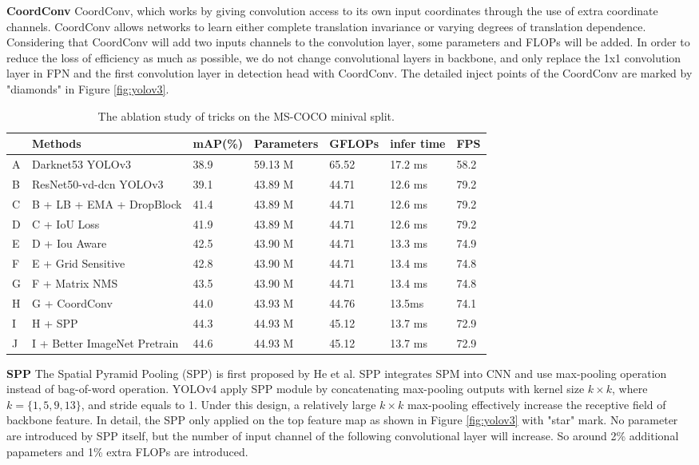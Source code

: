 \documentclass[10pt,twocolumn,letterpaper]{article}
\newcommand{\pheadB}[1] {\vspace{1mm}\noindent\textbf{#1}}
\begin{document}
	\pheadB{CoordConv} \cite{coordconv}
	CoordConv, which works by giving convolution access to its own input coordinates through the use of extra coordinate channels.  CoordConv allows networks to learn either complete translation invariance or varying degrees of translation dependence. Considering that CoordConv will add two inputs channels to the convolution layer, some parameters and FLOPs will be added. In order to reduce the loss of efficiency as much as possible, we do not change convolutional layers in backbone, and only replace the 1x1 convolution layer in FPN and the first convolution layer in detection head with CoordConv.
	The detailed inject points of the CoordConv are marked by "diamonds" in Figure \ref{fig:yolov3}.
	
	\begin{table*}[t!]
		\centering
\begin{tabular}{l|l|l|l|l|l|l}
			\hline
			& \textbf{Methods} & \textbf{mAP(\%)} & \textbf{Parameters} & \textbf{GFLOPs} & 
			\textbf{infer time} & \textbf{FPS} \\ 
			\hline
			\hline
			A & Darknet53 YOLOv3 & 38.9 &59.13 M & 65.52 & 17.2 ms & 58.2  \\ 
			\hline
			\hline
			B & ResNet50-vd-dcn YOLOv3 & 39.1 &43.89 M & 44.71 & 12.6 ms& 79.2 \\ 
			C & B + LB + EMA + DropBlock & 41.4 &43.89 M  & 44.71& 12.6 ms& 79.2\\ 
			D & C +  IoU Loss & 41.9 &43.89 M & 44.71 & 12.6 ms& 79.2 \\ 
			E & D + Iou Aware & 42.5 &43.90 M & 44.71 & 13.3 ms& 74.9\\ 
			F & E + Grid Sensitive& 42.8 &43.90 M & 44.71 & 13.4 ms& 74.8 \\ 
			G & F + Matrix NMS & 43.5 &43.90 M & 44.71& 13.4 ms& 74.8  \\ 
			H & G + CoordConv  & 44.0 &43.93 M & 44.76 & 13.5ms& 74.1 \\ 
			I & H + SPP & 44.3 &44.93 M & 45.12 & 13.7 ms& 72.9 \\
			J & I + Better ImageNet Pretrain  & 44.6 &44.93 M & 45.12 & 13.7 ms& 72.9  \\ 
			\hline
		\end{tabular}
\caption{The ablation study of tricks on the MS-COCO minival split.}
		\label{tab1}
	\end{table*}
	
	\pheadB{SPP} \cite{spp}
	The Spatial Pyramid Pooling (SPP) is first proposed by He et al\cite{spp}. SPP integrates SPM into CNN and use max-pooling operation instead of bag-of-word operation. 
	YOLOv4 apply SPP module by concatenating max-pooling outputs with kernel size $k \times k$, where $k = \{1, 5, 9, 13\}$, and stride equals to 1. Under this design, a relatively large $k \times k$ max-pooling effectively increase the receptive field of backbone feature. In detail, the SPP only applied on the top feature map as shown in Figure \ref{fig:yolov3} with "star" mark. No parameter are introduced by SPP itself, but the number of input channel of the following convolutional layer will increase. So around 2\% additional papameters and 1\% extra FLOPs are introduced.
	
\end{document}
